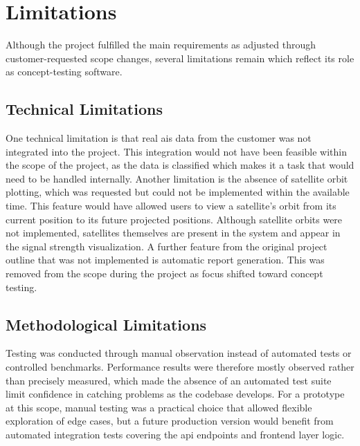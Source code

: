
\section{Limitations}

Although the project fulfilled the main requirements as adjusted through customer-requested scope changes, several limitations remain which reflect its role as concept-testing software. 

\subsection{Technical Limitations}

One technical limitation is that real \acrshort{ais} data from the customer was not integrated into the project. This integration would not have been feasible within the scope of the project, as the data is classified which makes it a task that would need to be handled internally. Another limitation is the absence of satellite orbit plotting, which was requested but could not be implemented within the available time. This feature would have allowed users to view a satellite's orbit from its current position to its future projected positions. Although satellite orbits were not implemented, satellites themselves are present in the system and appear in the signal strength visualization. A further feature from the original project outline that was not implemented is automatic report generation. This was removed from the scope during the project as focus shifted toward concept testing.

\subsection{Methodological Limitations}

Testing was conducted through manual observation instead of automated tests or controlled benchmarks. Performance results were therefore mostly observed rather than precisely measured, which made the absence of an automated test suite limit confidence in catching problems as the codebase develops. For a prototype at this scope, manual testing was a practical choice that allowed flexible exploration of edge cases, but a future production version would benefit from automated integration tests covering the \acrshort{api} endpoints and frontend layer logic.

